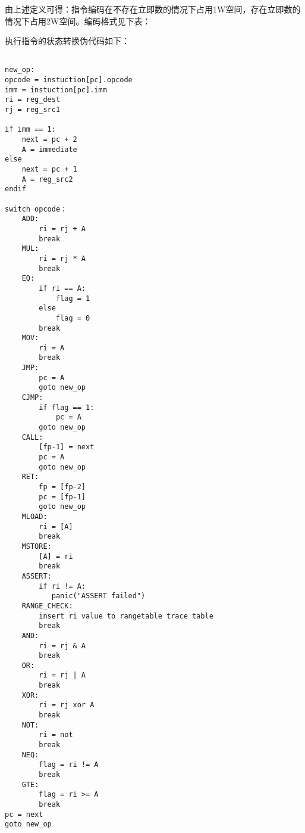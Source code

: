 由上述定义可得：指令编码在不存在立即数的情况下占用1W空间，存在立即数的情况下占用2W空间。编码格式见下表：

\begin{table}[!ht]
    \centering {}
    \caption{OlaVM指令编码格式}
    \label{table: processor_instruction_decode}
\end{table}

执行指令的状态转换伪代码如下：
\begin{lstlisting}[language={}]

new_op:
opcode = instuction[pc].opcode
imm = instuction[pc].imm
ri = reg_dest
rj = reg_src1

if imm == 1:
    next = pc + 2
    A = immediate
else
    next = pc + 1
    A = reg_src2
endif

switch opcode：
    ADD:
        ri = rj + A
        break
    MUL:
        ri = rj * A
        break
    EQ:
        if ri == A:
            flag = 1
        else
            flag = 0
        break
    MOV:
        ri = A
        break
    JMP:
        pc = A
        goto new_op
    CJMP:
        if flag == 1:
            pc = A
        goto new_op
    CALL:
        [fp-1] = next
        pc = A
        goto new_op
    RET:
        fp = [fp-2]
        pc = [fp-1]
        goto new_op
    MLOAD:
        ri = [A]
        break
    MSTORE:
        [A] = ri
        break
    ASSERT:
        if ri != A:
           panic("ASSERT failed")
    RANGE_CHECK:
        insert ri value to rangetable trace table
        break
    AND:
        ri = rj & A
        break
    OR:
        ri = rj | A
        break
    XOR:
        ri = rj xor A
        break
    NOT:
        ri = not
        break
    NEQ:
        flag = ri != A
        break
    GTE:
        flag = ri >= A
        break
pc = next
goto new_op
\end{lstlisting}

